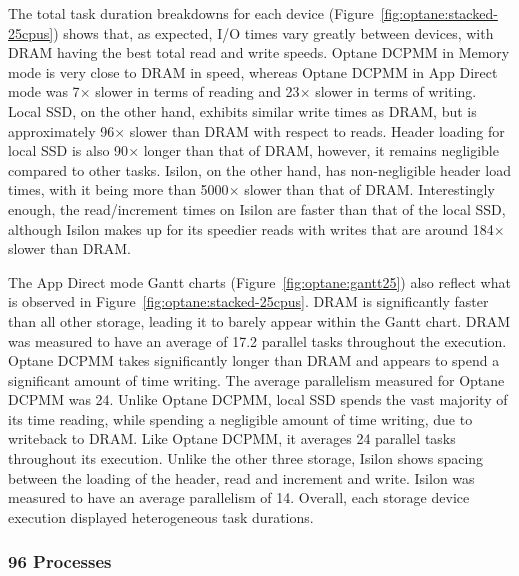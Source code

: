 The total task duration breakdowns for each device
(Figure~\ref{fig:optane:stacked-25cpus}) shows that, as expected, I/O times vary
greatly between devices, with DRAM having the best total read and write speeds.
Optane DCPMM in Memory mode is very close to DRAM in speed, whereas Optane DCPMM
in App Direct mode was 7$\times$ slower in terms of reading and 23$\times$ slower in terms of
writing. Local SSD, on the other hand, exhibits similar write times as DRAM, but
is approximately 96$\times$ slower than DRAM with respect to reads. Header loading for
local SSD is also 90$\times$ longer than that of DRAM, however, it remains negligible
compared to other tasks. Isilon, on the other hand, has non-negligible header
load times, with it being more than 5000$\times$ slower than that of DRAM.
Interestingly enough, the read/increment times on Isilon are faster than that of
the local SSD, although Isilon makes up for its speedier reads with writes that
are around 184$\times$ slower than DRAM.


The App Direct mode Gantt charts (Figure~\ref{fig:optane:gantt25}) also reflect what is
observed in Figure~\ref{fig:optane:stacked-25cpus}. DRAM is significantly faster than
all other storage, leading it to barely appear within the Gantt chart. DRAM was
measured to have an average of 17.2 parallel tasks throughout the execution.
Optane DCPMM takes significantly longer than DRAM and appears to spend a
significant amount of time writing. The average parallelism measured for Optane
DCPMM was 24. Unlike Optane DCPMM, local SSD spends the vast majority of its
time reading, while spending a negligible amount of time writing, due to
writeback to DRAM. Like Optane DCPMM, it averages 24 parallel tasks throughout
its execution. Unlike the other three storage, Isilon shows spacing between the
loading of the header, read and increment and write. Isilon was measured to have
an average parallelism of 14. Overall, each storage device execution displayed
heterogeneous task durations.

\subsubsection{96 Processes}

